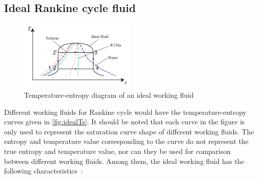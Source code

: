 \subsection{Ideal Rankine cycle fluid}
\label{sec:ircf}

\begin{figure}[!ht]
\centering 
\includegraphics[width=0.5\textwidth]{fig/idealTs}
\caption{Temperature-entropy diagram of an ideal working fluid}\label{fig:idealTs}
\end{figure}

Different working fluids for Rankine cycle would have the temperature-entropy curves given in \autoref{fig:idealTs}. It should be noted that each curve in the figure is only used to represent the saturation curve shape of different working fluids. The entropy and temperature value corresponding to the curve do not represent the true entropy and temperature value, nor can they be used for comparison between different working fluids. Among them, the ideal working fluid has the following characteristics~\cite{Abbin1977}:

